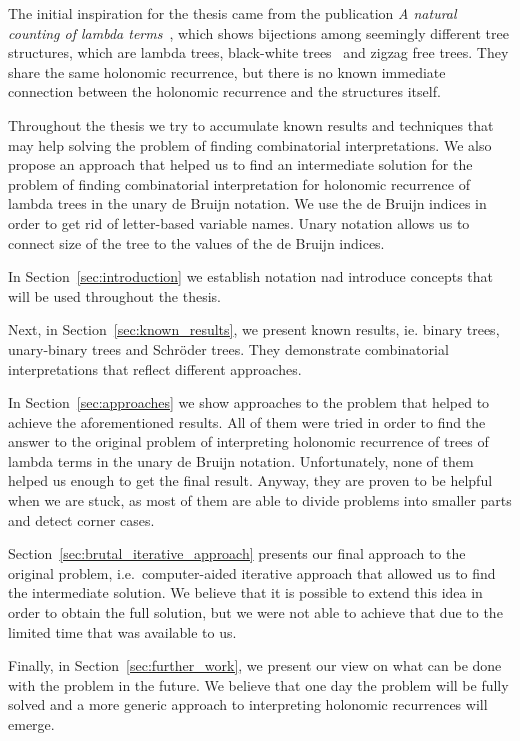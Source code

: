 \documentclass[final]{article}
\theoremstyle{definition}
\theoremstyle{definition}
\theoremstyle{remark}
\begin{document}
The initial inspiration for the thesis came from the publication \textit{A natural counting of lambda terms}~\cite{inspiration}, which shows bijections among seemingly different tree structures, which are lambda trees, black-white trees~\cite{blackwhite} and zigzag free trees. They share the same holonomic recurrence, but there is no known immediate connection between the holonomic recurrence and the structures itself.

Throughout the thesis we try to accumulate known results and techniques that may help solving the problem of finding combinatorial interpretations. We also propose an approach that helped us to find an intermediate solution for the problem of finding combinatorial interpretation for holonomic recurrence of lambda trees in the unary de Bruijn notation. We use the de Bruijn indices in order to get rid of letter-based variable names. Unary notation allows us to connect size of the tree to the values of the de Bruijn indices.

In Section~\ref{sec:introduction} we establish notation nad introduce concepts that will be used throughout the thesis.

Next, in Section~\ref{sec:known_results}, we present known results, ie. binary trees, unary-binary trees and Schröder trees. They demonstrate combinatorial interpretations that reflect different approaches.

In Section~\ref{sec:approaches} we show approaches to the problem that helped to achieve the aforementioned results. All of them were tried in order to find the answer to the original problem of interpreting holonomic recurrence of trees of lambda terms in the unary de Bruijn notation. Unfortunately, none of them helped us enough to get the final result. Anyway, they are proven to be helpful when we are stuck, as most of them are able to divide problems into smaller parts and detect corner cases.

Section~\ref{sec:brutal_iterative_approach} presents our final approach to the original problem, i.e.\ computer-aided iterative approach that allowed us to find the intermediate solution. We believe that it is possible to extend this idea in order to obtain the full solution, but we were not able to achieve that due to the limited time that was available to us.

Finally, in Section~\ref{sec:further_work}, we present our view on what can be done with the problem in the future. We believe that one day the problem will be fully solved and a more generic approach to interpreting holonomic recurrences will emerge.
\end{document}

